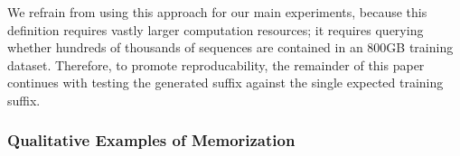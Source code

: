 We refrain from using this approach for our main experiments,
%
%
because this definition requires vastly larger computation resources; it requires
querying whether hundreds of thousands of sequences are contained in an 800GB
training dataset.
%
Therefore, to promote reproducability, the remainder of this paper continues with testing the generated suffix against the single expected training suffix.
%

\subsubsection{Qualitative Examples of Memorization}

